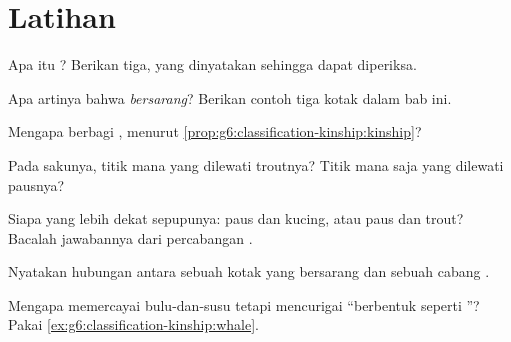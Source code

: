 \section{Latihan}

\begin{exercise}[$\star$]\label{exo:g6:classification-kinship:1}
Apa itu ? Berikan tiga, yang dinyatakan sehingga dapat
diperiksa.
\end{exercise}

\begin{exercise}[$\star$]\label{exo:g6:classification-kinship:2}
Apa artinya bahwa  \emph{bersarang}? Berikan contoh tiga kotak
dalam bab ini.
\end{exercise}

\begin{exercise}[$\star$]\label{exo:g6:classification-kinship:3}
Mengapa  berbagi , menurut
\cref{prop:g6:classification-kinship:kinship}?
\end{exercise}

\begin{exercise}[$\star$]\label{exo:g6:classification-kinship:4}
Pada  sakunya, titik  mana yang dilewati  troutnya?
Titik mana saja yang dilewati pausnya?
\end{exercise}

\begin{exercise}[$\star$]\label{exo:g6:classification-kinship:5}
Siapa yang lebih dekat sepupunya: paus dan kucing, atau paus dan 
trout? Bacalah jawabannya dari percabangan .
\end{exercise}

\begin{exercise}[$\star$]\label{exo:g6:classification-kinship:6}
Nyatakan hubungan antara sebuah kotak yang bersarang dan sebuah cabang
.
\end{exercise}

\begin{exercise}[$\star\star$]\label{exo:g6:classification-kinship:7}
Mengapa  memercayai bulu-dan-susu tetapi mencurigai
``berbentuk seperti ''? Pakai
\cref{ex:g6:classification-kinship:whale}.
\end{exercise}

